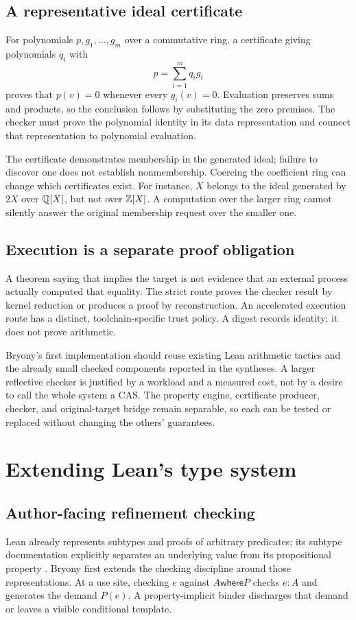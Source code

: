 \documentclass[11pt,a4paper]{article}
\newcommand{\code}[1]{\texttt{\detokenize{#1}}}
\theoremstyle{definition}\newtheorem{definition}[theorem]{Definition}
\theoremstyle{remark}\newtheorem{remark}[theorem]{Remark}
\begin{document}
\subsection{A representative ideal certificate}
For polynomials $p,g_1,\ldots,g_m$ over a commutative ring, a certificate giving polynomials $q_i$ with
\[
 p=\sum_{i=1}^m q_i g_i
\]
proves that $p(v)=0$ whenever every $g_i(v)=0$. Evaluation preserves sums and products, so the conclusion follows by substituting the zero premises. The checker must prove the polynomial identity in its data representation and connect that representation to polynomial evaluation.

The certificate demonstrates membership in the generated ideal; failure to discover one does not establish nonmembership. Coercing the coefficient ring can change which certificates exist. For instance, $X$ belongs to the ideal generated by $2X$ over $\mathbb Q[X]$, but not over $\mathbb Z[X]$. A computation over the larger ring cannot silently answer the original membership request over the smaller one.

\subsection{Execution is a separate proof obligation}
A theorem saying that \code{check c = true} implies the target is not evidence that an external process actually computed that equality. The strict route proves the checker result by kernel reduction or produces a proof by reconstruction. An accelerated execution route has a distinct, toolchain-specific trust policy. A digest records identity; it does not prove arithmetic.

Bryony's first implementation should reuse existing Lean arithmetic tactics and the already small checked components reported in the syntheses. A larger reflective checker is justified by a workload and a measured cost, not by a desire to call the whole system a CAS. The property engine, certificate producer, checker, and original-target bridge remain separable, so each can be tested or replaced without changing the others' guarantees.

\section{Extending Lean's type system}\label{sec:kernel}

\subsection{Author-facing refinement checking}
Lean already represents subtypes and proofs of arbitrary predicates; its subtype documentation explicitly separates an underlying value from its propositional property \cite{subtypes}. Bryony first extends the checking discipline around those representations. At a use site, checking $e$ against $A\mathbin{\mathsf{where}}P$ checks $e:A$ and generates the demand $P(e)$. A property-implicit binder discharges that demand or leaves a visible conditional template.
\end{document}
